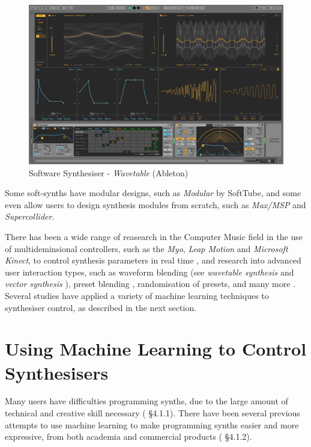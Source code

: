 \documentclass[11pt, oneside]{report}   	%
\begin{document}
\begin{figure}[h] 
	\centering
	\includegraphics[width = 5in]{AbletonWavetable.jpg}
	\caption{Software Synthesiser - \emph{Wavetable} (Ableton)\cite{Wavetable} }
	\label{fig:AbletonWavetable}
\end{figure}

Some soft-synths have modular designs, such as \emph{Modular} by SoftTube, %
and some even allow users to design synthesis modules from scratch, such as \emph{Max/MSP} and \emph{Supercollider}.

There has been a wide range of reasearch in the Computer Music field in the use of multideminsional controllers, such as the  \emph{Myo}, \emph{Leap Motion} and \emph{Microsoft Kinect}, to control synthesis parameters in real time \cite{ICMC, TubbThesis}, and research into advanced user interaction types, such as waveform blending (see \emph{wavetable synthesis} \cite{Wavetable} and \emph{vector synthesis} ), preset blending \cite{Interpolation}, randomisation of presets, and many more \cite{YeeKing, EvolvedAudioEffects}.  Several studies have applied a variety of machine learning techniques to synthesiser control, as described in the next section.

\section{Using Machine Learning to Control Synthesisers}\label{MachineLearning}
Many users have difficulties programming synths, due to the large amount of technical and creative skill necessary (\cite{YeeKing} \S 4.1.1). There have been several previous attempts to use machine learning to make programming synths easier and more expressive, from both academia and commercial products (\cite{YeeKing} \S 4.1.2).
\end{document}

